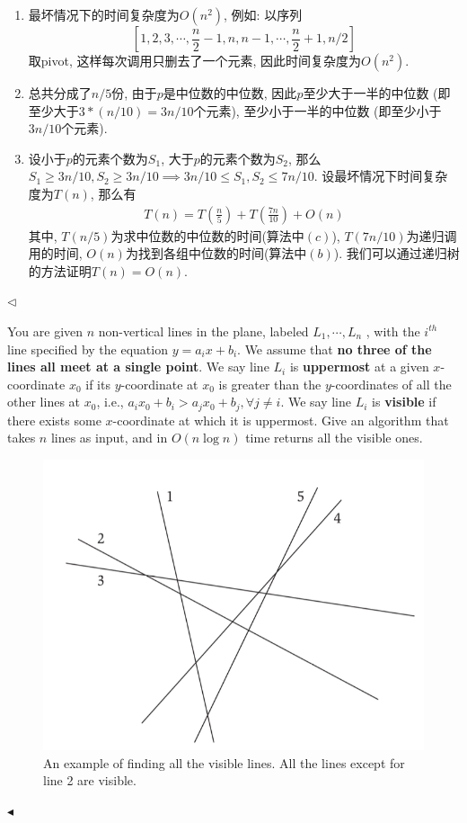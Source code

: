 \documentclass[11pt]{article}
\newenvironment{problem}[2][Problem]{\begin{trivlist}
\item[\hskip \labelsep{\bfseries#1}\hskip\labelsep{\bfseries#2.}]}{\hfill$\blacktriangleleft$\end{trivlist}}
\newenvironment{answer}[1][Answer]{\begin{trivlist}
\item[\hskip \labelsep{\bfseries\itshape#1.}\hskip \labelsep]}{\hfill$\lhd$\end{trivlist}}
\begin{document}
\begin{answer}
    \begin{enumerate}[label = (\alph*)]
        \item 最坏情况下的时间复杂度为$O(n^2)$, 例如: 以序列$$ \left[1,2, 3, \cdots, \frac{n}{2} - 1, n, n-1, \cdots, \frac{n}{2} + 1, n/2 \right]$$ 
        取pivot, 这样每次调用只删去了一个元素, 因此时间复杂度为$O(n^2)$.
        \item 总共分成了$n/5$份, 由于$p$是中位数的中位数, 因此$p$至少大于一半的中位数 (即至少大于$3 *(n/10) = 3n/10$个元素), 至少小于一半的中位数 (即至少小于$3n/10$个元素).
        \item 设小于$p$的元素个数为$S_1$, 大于$p$的元素个数为$S_2$, 那么$S_1 \ge 3n/10, S_2 \ge 3n/10 \implies 3n/10 \le S_1, S_2 \le 7n/10$.
        设最坏情况下时间复杂度为$T(n)$, 那么有
        \begin{align*}
            T(n) = T(\frac{n}{5}) + T(\frac{7n}{10}) + O(n)
        \end{align*}
        其中, $T(n/5)$为求中位数的中位数的时间(算法中$\left(c\right)$), $T(7n/10)$为递归调用的时间, $O(n)$为找到各组中位数的时间(算法中$\left(b\right)$).
        我们可以通过递归树的方法证明$T(n) = O(n)$.

    \end{enumerate}
\end{answer}
\begin{problem}{5 (Draw the Skyline!)}
    You are given $n$ non-vertical lines in the plane, labeled $L_1 , \cdots , L_n$ , 
    with the $i^{th}$ line specified by the equation $y = a_i x + b_i$. 
    We assume that \textbf{no three of the lines all meet at a single point}. 
    We say line $L_i$ is \textbf{uppermost} at a given $x$-coordinate $x_0$ 
    if its $y$-coordinate at $x_0$ is greater than the $y$-coordinates 
    of all the other lines at $x_0$, i.e., $a_i x_0 + b_i > a_j x_0 + b_j,  \forall j \ne i$. 
    We say line $L_i$ is \textbf{visible} if there exists some $x$-coordinate 
    at which it is uppermost. Give an algorithm that takes $n$ lines as input, 
    and in $O(n \log n)$ time returns all the visible ones.
    \begin{figure}[H]
        \centering
        \includegraphics[width = 0.35 \textwidth]{images/skyline.png}
        \caption{An example of finding all the visible lines. All the lines except for line 2 are visible.}
    \end{figure}
\end{problem}
\end{document}
